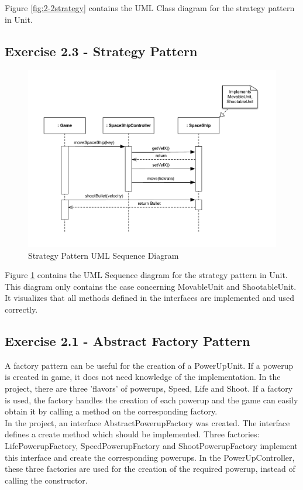 Figure \ref{fig:2-2strategy} contains the UML Class diagram for the strategy pattern in Unit.

\subsection{Exercise 2.3 - Strategy Pattern}

\begin{figure}[ht!]
\centering
\includegraphics[width=15cm]{SI-Sequence-Strategy.pdf}
\caption{Strategy Pattern UML Sequence Diagram}
\label{fig:2-3strategy}
\end{figure}

Figure \ref{fig:2-3strategy} contains the UML Sequence diagram for the strategy pattern in Unit. This diagram only contains the case concerning MovableUnit and ShootableUnit. It visualizes that all methods defined in the interfaces are implemented and used correctly.

\subsection{Exercise 2.1 - Abstract Factory Pattern}
A factory pattern can be useful for the creation of a PowerUpUnit. If a powerup is created in game, it does not need knowledge of the implementation. In the project, there are three 'flavors' of powerups, Speed, Life and Shoot. If a factory is used, the factory handles the creation of each powerup and the game can easily obtain it by calling a method on the corresponding factory.\\

In the project, an interface AbstractPowerupFactory was created. The interface defines a create method which should be implemented. Three factories: LifePowerupFactory, SpeedPowerupFactory and ShootPowerupFactory implement this interface and create the corresponding powerups. In the PowerUpController, these three factories are used for the creation of the required powerup, instead of calling the constructor. 


